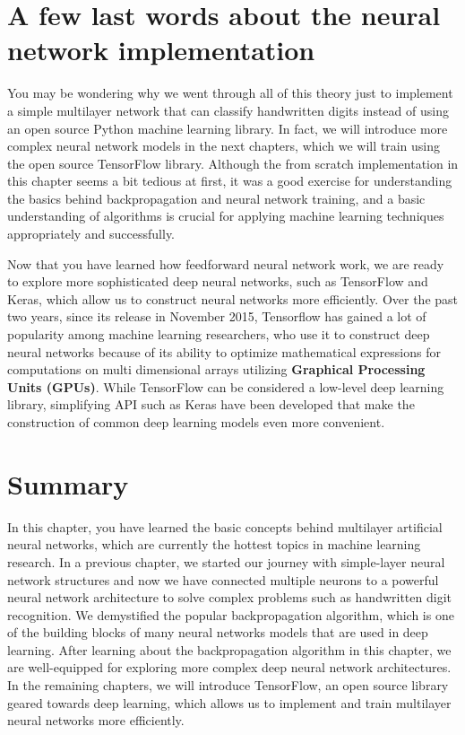 \documentclass[11pt]{article}
\begin{document}
    \section{A few last words about the neural network
implementation}\label{a-few-last-words-about-the-neural-network-implementation}

    You may be wondering why we went through all of this theory just to
implement a simple multilayer network that can classify handwritten
digits instead of using an open source Python machine learning library.
In fact, we will introduce more complex neural network models in the
next chapters, which we will train using the open source TensorFlow
library. Although the from scratch implementation in this chapter seems
a bit tedious at first, it was a good exercise for understanding the
basics behind backpropagation and neural network training, and a basic
understanding of algorithms is crucial for applying machine learning
techniques appropriately and successfully.

Now that you have learned how feedforward neural network work, we are
ready to explore more sophisticated deep neural networks, such as
TensorFlow and Keras, which allow us to construct neural networks more
efficiently. Over the past two years, since its release in November
2015, Tensorflow has gained a lot of popularity among machine learning
researchers, who use it to construct deep neural networks because of its
ability to optimize mathematical expressions for computations on multi
dimensional arrays utilizing \textbf{Graphical Processing Units (GPUs)}.
While TensorFlow can be considered a low-level deep learning library,
simplifying API such as Keras have been developed that make the
construction of common deep learning models even more convenient.

    \section{Summary}\label{summary}

    In this chapter, you have learned the basic concepts behind multilayer
artificial neural networks, which are currently the hottest topics in
machine learning research. In a previous chapter, we started our journey
with simple-layer neural network structures and now we have connected
multiple neurons to a powerful neural network architecture to solve
complex problems such as handwritten digit recognition. We demystified
the popular backpropagation algorithm, which is one of the building
blocks of many neural networks models that are used in deep learning.
After learning about the backpropagation algorithm in this chapter, we
are well-equipped for exploring more complex deep neural network
architectures. In the remaining chapters, we will introduce TensorFlow,
an open source library geared towards deep learning, which allows us to
implement and train multilayer neural networks more efficiently.


    
    
    
    
\end{document}
